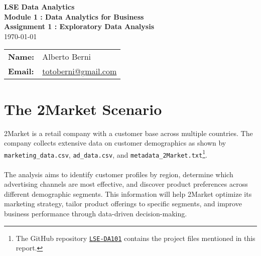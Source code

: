 \documentclass[12pt,a4paper]{article}
\newcommand{\textittt}[1]{\texttt{#1}}
\begin{document}
\begin{titlepage}
  \centering
  \vspace*{8cm}
  {\Huge \textbf{LSE Data Analytics}}\\[1.5cm]
  {\Large \textbf{Module 1 : Data Analytics for Business}}\\[0.3cm]
  {\Large \textbf{Assignment 1 : Exploratory Data Analysis}}\\[1cm]
  {\large \today}\\[1cm]
  \begin{tabular}{ll}
    \textbf{Name:} & Alberto Berni \\
    \textbf{Email:} & \href{mailto:totoberni@gmail.com}{totoberni@gmail.com} \\
  \end{tabular}
  \vfill
\end{titlepage}

\tableofcontents
\newpage

\setcounter{page}{1}

\section{The 2Market Scenario}

2Market is a retail company with a customer base across multiple countries. The company collects extensive data on customer demographics as shown by \textittt{marketing\_data.csv}, \textittt{ad\_data.csv}, and \textittt{metadata\_2Market.txt}\footnote{The GitHub repository \href{https://github.com/totoberni/LSE-DA101.git}{\textittt{LSE-DA101}} contains the project files mentioned in this report.}. \\
\\
The analysis aims to identify customer profiles by region, determine which advertising channels are most effective, and discover product preferences across different demographic segments. This information will help 2Market optimize its marketing strategy, tailor product offerings to specific segments, and improve business performance through data-driven decision-making.
\end{document}

